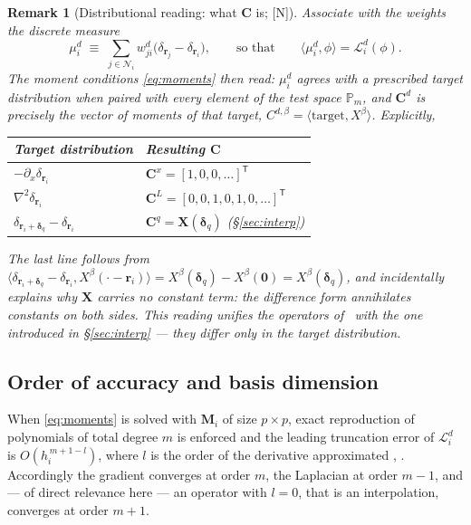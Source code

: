 \documentclass[11pt,a4paper]{article}
\newcommand{\New}{\textcolor{blue!60!black}{\textsf{[N]}}}
\newtheorem{remark}{Remark}
\begin{document}
\begin{remark}[Distributional reading: what $\bm C$ is; \New]
\label{rem:distribution}
Associate with the weights the discrete measure
\begin{equation}
\mu^{d}_i\;\equiv\;\sum_{j\in\mathcal N_i}w^{d}_{ji}
\bigl(\delta_{\bm r_j}-\delta_{\bm r_i}\bigr),
\qquad\text{so that}\qquad
\bigl\langle\mu^{d}_i,\phi\bigr\rangle=\mathcal L^{d}_i(\phi).
\label{eq:measure}
\end{equation}
The moment conditions \eqref{eq:moments} then read: \emph{$\mu^d_i$ agrees with a
prescribed target distribution when paired with every element of the test space
$\mathbb P_m$}, and $\bm C^d$ is precisely the vector of moments of that target,
$C^{d,\beta}=\langle\text{target},X^\beta\rangle$. Explicitly,
\begin{center}
\begin{tabular}{ll}
\toprule
Target distribution & Resulting $\bm C$ \\
\midrule
$-\partial_x\delta_{\bm r_i}$ & $\bm C^{x}=[1,0,0,\dots]^{\mathsf T}$ \\
$\nabla^{2}\delta_{\bm r_i}$ & $\bm C^{L}=[0,0,1,0,1,0,\dots]^{\mathsf T}$ \\
$\delta_{\bm r_i+\bm\delta_q}-\delta_{\bm r_i}$ & $\bm C^{q}=\bm X(\bm\delta_q)$
\quad(\S\ref{sec:interp}) \\
\bottomrule
\end{tabular}
\end{center}
The last line follows from
$\langle\delta_{\bm r_i+\bm\delta_q}-\delta_{\bm r_i},X^\beta(\cdot-\bm r_i)\rangle
=X^\beta(\bm\delta_q)-X^\beta(\bm 0)=X^\beta(\bm\delta_q)$, and incidentally explains
why $\bm X$ carries no constant term: the difference form annihilates constants on both
sides. This reading unifies the operators of~\cite{KLN2020,KL2021} with the one
introduced in \S\ref{sec:interp} --- they differ only in the target distribution.
\end{remark}

\subsection{Order of accuracy and basis dimension}

When \eqref{eq:moments} is solved with $\bm M_i$ of size $p\times p$, exact
reproduction of polynomials of total degree $m$ is enforced and the leading truncation
error of $\mathcal L^d_i$ is $O\!\left(h_i^{\,m+1-l}\right)$, where $l$ is the order of
the derivative approximated \cite[\S 3.1]{KLN2020}, \cite[\S 2]{KL2021}.
Accordingly the gradient converges at order $m$, the Laplacian at order $m-1$, and
--- of direct relevance here --- an operator with $l=0$, that is an interpolation,
converges at order $m+1$.
\end{document}
